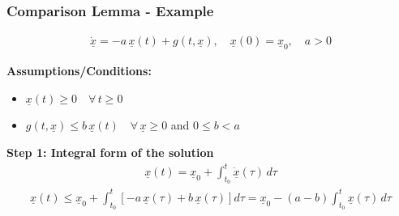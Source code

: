 \documentclass[student, noshadow, lsr, english, aspectratio=169, t]{ITR_LSR_slides}
\begin{document}
\begin{frame}
    \frametitle{Comparison Lemma - Example}

    \vspace{-0.5cm}
    \begin{tcolorbox}[title=Problem: Analyze stability of a scalar perturbed system]
        \vspace{-0.4cm}
        \begin{align*}
            \dot{\underline{x}} = -a\,\underline{x}(t) + g(t, \underline{x}), \quad \underline{x}(0) = \underline{x}_0, \quad a > 0
        \end{align*}
    \end{tcolorbox}

    \textbf{Assumptions/Conditions:}
    \begin{itemize}
        \item $\underline{x}(t) \geq 0 \quad \forall\, t \geq 0$
        \item $g(t, \underline{x}) \leq b\,\underline{x}(t) \quad \forall\, \underline{x} \geq 0$ and $0 \leq b < a$
    \end{itemize}

    \vspace{0.3cm}
    \textbf{Step 1: Integral form of the solution}
    \begin{align*}
        \underline{x}(t) = \underline{x}_0 + \int_{t_0}^{t} \dot{\underline{x}}(\tau)\, d\tau
    \end{align*}
    \begin{align*}
        \underline{x}(t) \leq \underline{x}_0 + \int_{t_0}^{t} \left[-a\,\underline{x}(\tau) + b\,\underline{x}(\tau)\right] d\tau = \underline{x}_0 - (a - b) \int_{t_0}^{t} \underline{x}(\tau)\, d\tau
    \end{align*}
\end{frame}
\end{document}

